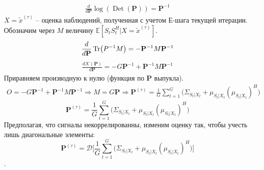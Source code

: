 \documentclass[11pt]{article}
\newcommand{\Expect}{\mathbb{E}}
\DeclareMathOperator{\Det}{Det}
\begin{document}
\begin{equation*}
\begin{gathered}
\frac{d}{d\mathbf{P}}\log (\Det (\mathbf{P})) = \mathbf{P}^{-1}
\end{gathered}
\end{equation*}
$X = \widetilde{x}^{(\tau)}$ -- оценка наблюдений, полученная с учетом Е-шага текущей итерации.
Обозначим через $M$ величину $\Expect[S_t S_t^H\Big| X = \widetilde{x}^{(\tau)}]$.
\begin{equation*}
\begin{gathered}
\frac{d}{d\mathbf{P}}\Tr(P^{-1}M)= -\mathbf{P}^{-1}M\mathbf{P}^{-1}
\end{gathered}
\end{equation*}
\begin{equation*}
\begin{gathered}
\frac{d\mathcal{K}(\mathbf{P})}{d\mathbf{P}} = -G\mathbf{P}^{-1}+\mathbf{P}^{-1}M\mathbf{P}^{-1}
\end{gathered}
\end{equation*}
Приравняем производную к нулю (функция по $\mathbf{P}$ выпукла).
\begin{equation*}
\begin{gathered}
O = -G\mathbf{P}^{-1}+\mathbf{P}^{-1}M\mathbf{P}^{-1} \Rightarrow M =G\mathbf{P} \Rightarrow \mathbf{P}^{(\tau)} = \frac{1}{G} \sum_{t=1}^G \Big( \Sigma_{S_t|X_t} +  \mu_{S_t|X_t}  (\mu_{S_t|X_t})^H \Big)
\end{gathered}
\end{equation*}
\begin{equation}
\mathbf{P}^{(\tau)} = \frac{1}{G} \sum_{t=1}^G \Big( \Sigma_{S_t|X_t} +  \mu_{S_t|X_t}  (\mu_{S_t|X_t})^H \Big)
\end{equation}
Предполагая, что сигналы некоррелированны, изменим оценку так, чтобы учесть лишь диагональные элементы:
\begin{equation}
\mathbf{P}^{(\tau)} =  \mathcal{D} \bigg[\frac{1}{G}\sum_{t=1}^G \Big( \Sigma_{S_t|X_t} +  \mu_{S_t|X_t}  (\mu_{S_t|X_t})^H \Big)\bigg]
\end{equation}.
\clearpage
\begin{center}
\fontsize{16}{20}\selectfont {}
\end{center}
\begin{center}
\fontsize{14}{18}\selectfont {}
\end{center}
\begin{center}
\fontsize{14}{18}\selectfont {}
\end{center}
\end{document}
